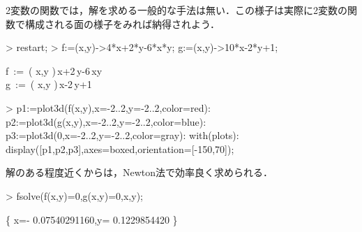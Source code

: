 2変数の関数では，解を求める一般的な手法は無い．この様子は実際に2変数の関数で構成される面の様子をみれば納得されよう．
\begin{MapleInput}
> restart;
> f:=(x,y)->4*x+2*y-6*x*y; g:=(x,y)->10*x-2*y+1;
\end{MapleInput}
\begin{MapleOutputGather}
f\, := \,( {x,y} )\,x+2\,y-6\,xy \notag \\
g\, := \,( {x,y} )\,x-2\,y+1 \notag
\end{MapleOutputGather}
\begin{MapleInput}
> p1:=plot3d({f(x,y)},x=-2..2,y=-2..2,color=red):
  p2:=plot3d({g(x,y)},x=-2..2,y=-2..2,color=blue):
  p3:=plot3d({0},x=-2..2,y=-2..2,color=gray):
  with(plots):
  display([p1,p2,p3],axes=boxed,orientation=[-150,70]);
\end{MapleInput}

解のある程度近くからは，Newton法で効率良く求められる．
\begin{MapleInput}
> fsolve({f(x,y)=0,g(x,y)=0},{x,y});
\end{MapleInput}
\begin{MapleOutput}
\left\{ x=- 0.07540291160,y= 0.1229854420 \right\}
\end{MapleOutput}